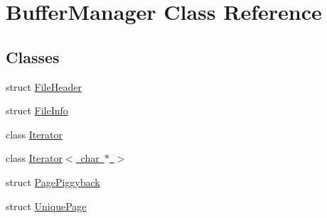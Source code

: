 \hypertarget{class_buffer_manager}{}\section{Buffer\+Manager Class Reference}
\label{class_buffer_manager}
\subsection*{Classes}
\begin{DoxyCompactItemize}
\item 
struct \mbox{\hyperlink{struct_buffer_manager_1_1_file_header}{File\+Header}}
\item 
struct \mbox{\hyperlink{struct_buffer_manager_1_1_file_info}{File\+Info}}
\item 
class \mbox{\hyperlink{class_buffer_manager_1_1_iterator}{Iterator}}
\item 
class \mbox{\hyperlink{class_buffer_manager_1_1_iterator_3_01char_01_5_01_4}{Iterator$<$ char $\ast$ $>$}}
\item 
struct \mbox{\hyperlink{struct_buffer_manager_1_1_page_piggyback}{Page\+Piggyback}}
\item 
struct \mbox{\hyperlink{struct_buffer_manager_1_1_unique_page}{Unique\+Page}}
\end{DoxyCompactItemize}
